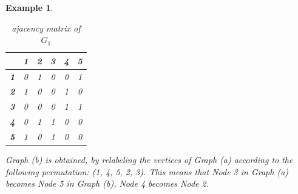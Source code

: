 \documentclass[12pt,a4paper]{article}
\newtheorem{exa}[thm]{Example}
\begin{document}
\begin{exa}
\begin{table}[!htb]
\begin{minipage}{.5\linewidth}
		\begin{tabular}{|c|c|c|c|c|c|}
			\hline 
			& \textbf{1} & \textbf{2} & \textbf{3} & \textbf{4} & \textbf{5} \\ 
			\hline 
			\textbf{1} & 0 & 1 & 0 & 0 & 1 \\ 
			\hline 
			\textbf{2} & 1 & 0 & 0 & 1 & 0 \\ 
			\hline 
			\textbf{3} & 0 & 0 & 0 & 1 & 1 \\ 
			\hline 
			\textbf{4} & 0 & 1 & 1 & 0 & 0 \\ 
			\hline 
			\textbf{5} & 1 & 0 & 1 & 0 & 0 \\ 
			\hline 
		\end{tabular}
			\caption{ajacency matrix of $G_1$}
	\end{minipage} 
\end{table}

Graph (b) is obtained, by relabeling the vertices of Graph (a) according to the following permutation: (1, 4, 5, 2, 3). This means that Node 3 in Graph (a) becomes Node 5 in Graph (b), Node 4 becomes Node 2. 
\end{exa}
\end{document}
